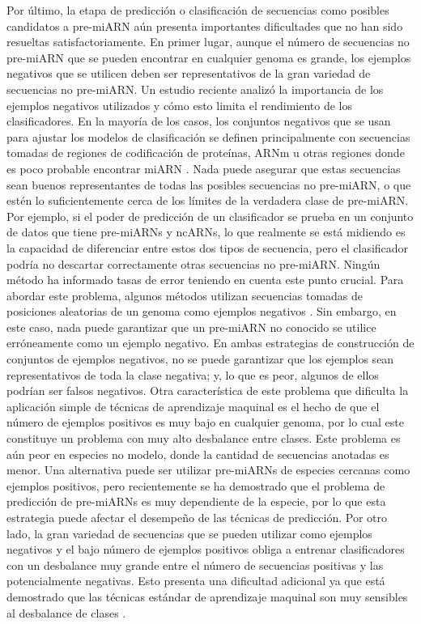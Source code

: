 Por último, la etapa de predicción o clasificación de secuencias como posibles candidatos a pre-miARN aún presenta importantes dificultades que no han sido
resueltas satisfactoriamente. En primer lugar, aunque el número de secuencias no pre-miARN que se pueden encontrar en cualquier genoma es grande, los ejemplos
negativos que se utilicen deben ser representativos de la gran variedad de secuencias no pre-miARN. Un estudio reciente \citep{wei2014improved} analizó la
importancia de los ejemplos negativos utilizados y cómo esto limita el rendimiento de los clasificadores. En la mayoría de los casos, los conjuntos negativos
que se usan para ajustar los modelos de clasificación se definen principalmente con secuencias tomadas de regiones de codificación de proteínas, ARNm u otras
regiones donde es poco probable encontrar miARN \citep{peace2015framework, tempel2015mirboost}. Nada puede asegurar que estas secuencias sean buenos
representantes de todas las posibles secuencias no pre-miARN, o que estén lo suficientemente cerca de los límites de la verdadera clase de pre-miARN. Por ejemplo,
si el poder de predicción de un clasificador se prueba en un conjunto de datos que tiene pre-miARNs y ncARNs, lo que realmente se está midiendo es la capacidad
de diferenciar entre estos dos tipos de secuencia, pero el clasificador podría no descartar correctamente otras secuencias no pre-miARN. Ningún método ha
informado tasas de error teniendo en cuenta este punto crucial. Para abordar este problema, algunos métodos utilizan secuencias tomadas de posiciones aleatorias
de un genoma como ejemplos negativos \citep{wenyuan2013training, gudys2013huntmi}. Sin embargo, en este caso, nada puede garantizar que un pre-miARN no conocido
se utilice erróneamente como un ejemplo negativo. En ambas estrategias de construcción de conjuntos de ejemplos negativos, no se puede garantizar que los
ejemplos sean representativos de toda la clase negativa; y, lo que es peor, algunos de ellos podrían ser falsos negativos. Otra característica de este problema
que dificulta la aplicación simple de técnicas de aprendizaje maquinal es el hecho de que el número de ejemplos positivos es muy bajo en cualquier genoma, por
lo cual este constituye un problema con muy alto desbalance entre clases. Este problema es aún peor en especies no modelo, donde la cantidad de secuencias
anotadas es menor. Una alternativa puede ser utilizar pre-miARNs de especies cercanas como ejemplos positivos, pero recientemente se ha demostrado
\citep{lopes2016automatic} que el problema de predicción de pre-miARNs es muy dependiente de la especie, por lo que esta estrategia puede afectar el desempeño
de las técnicas de predicción. Por otro lado, la gran variedad de secuencias que se pueden utilizar como ejemplos negativos y el bajo número de ejemplos
positivos obliga a entrenar clasificadores con un desbalance muy grande entre el número de secuencias positivas y las potencialmente negativas. Esto presenta
una dificultad adicional ya que está demostrado que las  técnicas estándar de aprendizaje maquinal son muy sensibles al desbalance de clases
\citep{guo2008class}.

